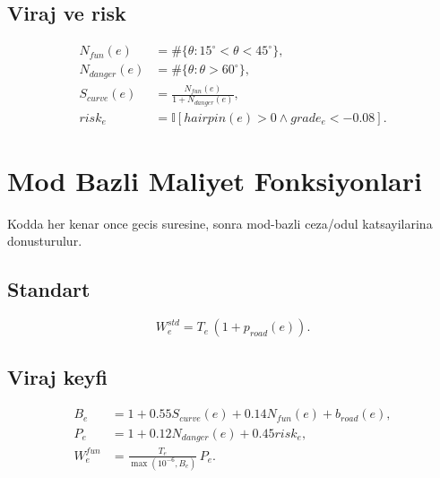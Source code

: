 ﻿\documentclass[11pt,a4paper]{article}
\begin{document}
\subsection{Viraj ve risk}
\begin{align}
N_{fun}(e)&=\#\{\theta:15^\circ<\theta<45^\circ\},\\
N_{danger}(e)&=\#\{\theta:\theta>60^\circ\},\\
S_{curve}(e)&=\frac{N_{fun}(e)}{1+N_{danger}(e)},\\
risk_e&=\mathbb{I}[hairpin(e)>0\land grade_e<-0.08].
\end{align}

\begin{center}
\end{center}

\section{Mod Bazli Maliyet Fonksiyonlari}
\noindent Kodda her kenar once gecis suresine, sonra mod-bazli ceza/odul katsayilarina donusturulur.

\subsection{Standart}
\begin{equation}
W^{std}_e = T_e\,(1+p_{road}(e)).
\end{equation}

\subsection{Viraj keyfi}
\begin{align}
B_e &= 1 + 0.55S_{curve}(e) + 0.14N_{fun}(e) + b_{road}(e),\\
P_e &= 1 + 0.12N_{danger}(e) + 0.45risk_e,\\
W^{fun}_e &= \frac{T_e}{\max(10^{-6},B_e)}\,P_e.
\end{align}
\end{document}

